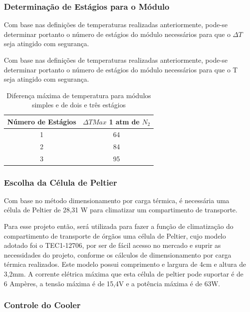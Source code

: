 \subsubsection{Determinação de Estágios para o Módulo}
Com base nas definições de temperaturas realizadas anteriormente, pode-se determinar portanto o número de estágios do módulo necessários para que o $\Delta T$ seja atingido com segurança.

Com base nas definições de temperaturas realizadas anteriormente, pode-se determinar portanto o número de estágios do módulo necessários para que o T seja atingido com segurança.

\begin{table}[H]
\begin{center}
\caption{Diferença máxima de temperatura para módulos simples e de dois e três estágios}
\begin{tabular}{c||c}
\textbf{Número de Estágios} & \textbf{$\Delta T Max$} 1 atm de $N_2$\\
\hline \hline
1 & 64\\
2 & 84 \\
3 & 95\\
\hline \hline
\end{tabular}
\end{center}
\end{table}

\subsubsection{ Escolha da Célula de Peltier}
Com base no método dimensionamento por carga térmica, é necessária uma célula de Peltier de 28,31  W para climatizar um compartimento de transporte.

Para esse projeto então, será utilizada para fazer a função de climatização do compartimento de transporte de órgãos uma célula de Peltier, cujo modelo adotado foi o TEC1-12706, por ser de fácil acesso no mercado e suprir as necessidades do projeto, conforme os cálculos de dimensionamento por carga térmica realizados. Este modelo possui comprimento e largura de 4cm e altura de 3,2mm. A corrente elétrica máxima que esta célula de peltier pode suportar é de 6 Ampères, a tensão máxima é de 15,4V e a potência máxima é de 63W. 

\subsubsection{Controle do Cooler}

